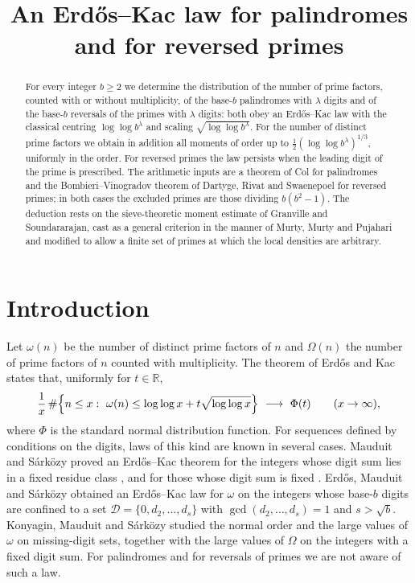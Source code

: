\documentclass[11pt,a4paper]{article}
\title{An Erd\H os--Kac law for palindromes and for reversed primes}
\author{}
\date{}
\theoremstyle{plain}
\theoremstyle{definition}
\numberwithin{equation}{section}
\begin{document}
\maketitle

\begin{abstract}\noindent
For every integer $b\ge2$ we determine the distribution of the number of prime factors, counted with
or without multiplicity, of the base-$b$ palindromes with $\lambda$ digits and of the base-$b$
reversals of the primes with $\lambda$ digits: both obey an Erd\H os--Kac law with the classical
centring $\log\log b^{\lambda}$ and scaling $\sqrt{\log\log b^{\lambda}}$. For the number of distinct
prime factors we obtain in addition all moments of order up to $\tfrac12(\log\log b^{\lambda})^{1/3}$,
uniformly in the order. For reversed primes the law persists when the leading digit of the
prime is prescribed. The arithmetic inputs are a theorem of Col for palindromes and the
Bombieri--Vinogradov theorem of Dartyge, Rivat and Swaenepoel for reversed primes; in both cases the
excluded primes are those dividing $b(b^{2}-1)$. The deduction rests on the sieve-theoretic moment
estimate of Granville and Soundararajan, cast as a general criterion in the manner of Murty, Murty and
Pujahari and modified to allow a finite set of primes at which the local densities are arbitrary.
\end{abstract}

\medskip
{}

\section{Introduction}

Let $\omega(n)$ be the number of distinct prime factors of $n$ and $\Omega(n)$ the number of prime
factors of $n$ counted with multiplicity. The theorem of Erd\H os and Kac \cite{EK} states that,
uniformly for $t\in\mathbb R$,
\begin{equation}\label{eq:EK}
\frac1x\,\#\Bigl\{n\le x:\ \omega(n)\le \log\log x+t\sqrt{\log\log x}\Bigr\}\ \longrightarrow\ \Phi(t)
\qquad(x\to\infty),
\end{equation}
where $\Phi$ is the standard normal distribution function. For sequences defined by conditions on the
digits, laws of this kind are known in several cases. Mauduit and S\'ark\"ozy proved an
Erd\H os--Kac theorem for the integers whose digit sum lies in a fixed residue class \cite{MS1}, and
for those whose digit sum is fixed \cite[Thm.~4]{MS2}. Erd\H os, Mauduit and S\'ark\"ozy
\cite[Thm.~1]{EMS} obtained an Erd\H os--Kac law for $\omega$ on the integers whose base-$b$ digits
are confined to a set $\mathcal D=\{0,d_2,\dots,d_s\}$ with $\gcd(d_2,\dots,d_s)=1$ and $s>\sqrt b$.
Konyagin, Mauduit and S\'ark\"ozy \cite{KMS} studied the normal order and the large values of $\omega$
on missing-digit sets, together with the large values of $\Omega$ on the integers with a fixed digit
sum. For palindromes and for reversals of primes we are not aware of such a law.
\end{document}
